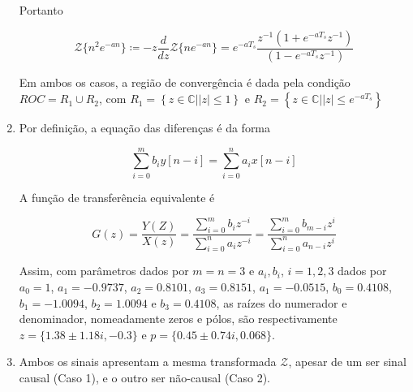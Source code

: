 \begin{enumerate}
        Portanto 
        
            \begin{equation}
                \mathcal{Z}\{n^2 e^{-a n}\} \coloneqq -z \frac{d}{dz} \mathcal{Z}\{n e^{-a n}\} = e^{-a T_s} \frac{z^{-1}(1 + e^{-a T_s} z^{-1})}{(1 - e^{-a T_s} z^{-1})}
            \end{equation}
        
        Em ambos os casos, a região de convergência é dada pela condição $ROC = R_1 \cup R_2$, com $R_1 = \left\{z \in \mathbb{C} | |z| \leq 1 \right\}$ e $R_2 = \left\{z \in \mathbb{C} | |z| \leq e^{-a T_s} \right\}$
        
        \item %
        
        Por definição, a equação das diferenças é da forma
        
            \begin{equation}
                \sum_{i=0}^{m} b_i y[n-i] = \sum_{i=0}^{n} a_i x[n-i]
            \end{equation}
        
        A função de transferência equivalente é
        
            \begin{equation}
                G(z) = \frac{Y(Z)}{X(z)} = \frac{\sum_{i=0}^{m} b_{i} z^{-i}}{\sum_{i=0}^{n} a_{i} z^{-i}} = \frac{\sum_{i=0}^{m} b_{m-i} z^{i}}{\sum_{i=0}^{n} a_{n-i} z^{i}}
            \end{equation}
        
        Assim, com parâmetros dados por $m = n = 3$ e $a_i, b_i$, $i = 1, 2, 3$ dados por $a_0 = 1$, $a_1 = -0.9737$, $a_2 = 0.8101$, $a_3 = 0.8151$, $a_1 = -0.0515$, $b_0 = 0.4108$, $b_1 = -1.0094$, $b_2 = 1.0094$ e $b_3 = 0.4108$, as raízes do numerador e denominador, nomeadamente zeros e pólos, são respectivamente $z = \{1.38 \pm 1.18 i, -0.3\}$ e $p = \{0.45 \pm 0.74i, 0.068\}$.
        
        \item %
        
        Ambos os sinais apresentam a mesma transformada $\mathcal{Z}$, apesar de um ser sinal causal (Caso 1), e o outro ser não-causal (Caso 2).
        

\end{enumerate}
